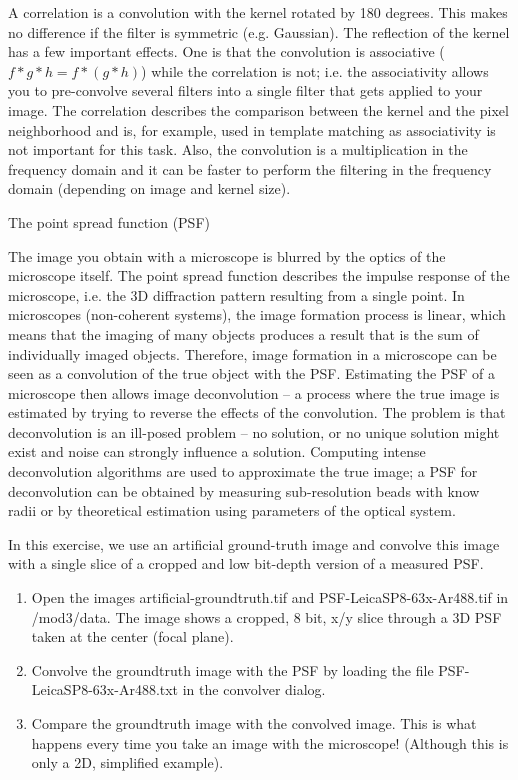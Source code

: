A correlation is a convolution with the kernel rotated by 180 degrees. This makes no difference if the filter is symmetric (e.g. Gaussian). The reflection of the kernel has a few important effects. One is that the convolution is associative ($f * g * h = f * (g * h)$) while the correlation is not; i.e. the associativity allows you to pre-convolve several filters into a single filter that gets applied to your image. The correlation describes the comparison between the kernel and the pixel neighborhood and is, for example, used in template matching as associativity is not important for this task. Also, the convolution is a multiplication in the frequency domain and it can be faster to perform the filtering in the frequency domain (depending on image and kernel size). 

\begin{taskbox}{The point spread function (PSF)}

The image you obtain with a microscope is blurred by the optics of the microscope itself. The point spread  function describes the impulse response of the microscope, i.e. the 3D diffraction pattern resulting from a single point. In microscopes (non-coherent systems), the image formation process is linear, which means that the imaging of many objects produces a result that is the sum of individually imaged objects. Therefore, image formation in a microscope can be seen as a convolution of the true object with the PSF. Estimating the PSF of a microscope then allows image deconvolution -- a process where the true image is estimated by trying to reverse the effects of the convolution. The problem is that deconvolution is an ill-posed problem -- no solution, or no unique solution might exist and noise can strongly influence a solution. Computing intense deconvolution algorithms are used to approximate the true image; a PSF for deconvolution can be obtained by measuring sub-resolution beads with know radii or by theoretical estimation using parameters of the optical system. 

In this exercise, we use an artificial ground-truth image and convolve this image with a single slice of a cropped and low bit-depth version of a measured PSF. 

\begin{enumerate}
	\item Open the images artificial-groundtruth.tif and PSF-LeicaSP8-63x-Ar488.tif in /mod3/data. The image shows a cropped, 8 bit, x/y slice through a 3D PSF taken at the center (focal plane). 
	\item Convolve the groundtruth image with the PSF by loading the file PSF-LeicaSP8-63x-Ar488.txt in the convolver dialog.
	\item Compare the groundtruth image with the convolved image. This is what happens every time you take an image with the microscope! (Although this is only a 2D, simplified example).
	\end{enumerate}
\end{taskbox}

